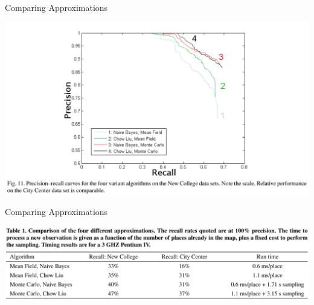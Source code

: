 \begin{frame}{Comparing Approximations}
    \begin{center}
        \includegraphics[width=\textwidth]{./media/compare_fig.png}
    \end{center}
\end{frame}

\begin{frame}{Comparing Approximations}
    \begin{center}
        \includegraphics[width=\textwidth]{./media/table.png}
    \end{center}
\end{frame}
